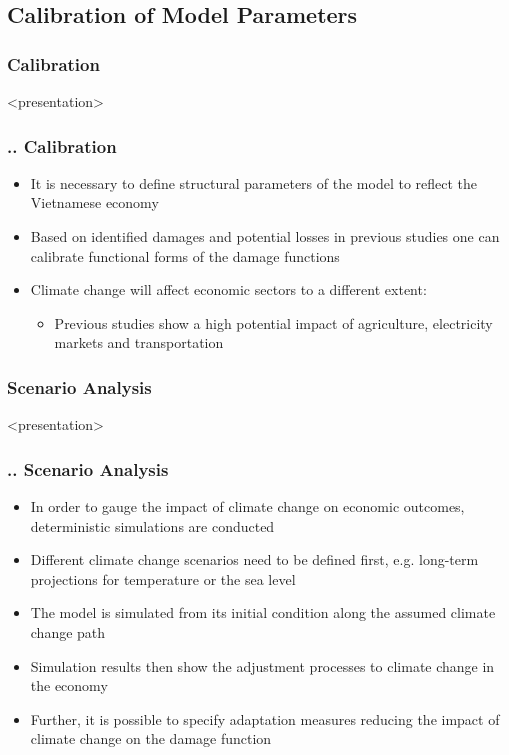\documentclass[11pt,aspectratio=169]{beamer}
\begin{document}
\subsection{Calibration of Model Parameters}
\subsubsection{Calibration}
\begin{frame}<presentation>
	\frametitle{{\thesection.\thesubsection.\thesubsubsection} Calibration}
	\begin{itemize}
		\item	It is necessary to define structural parameters of the model to reflect the Vietnamese economy
		\item Based on identified damages and potential losses in previous studies one can calibrate functional forms of the damage functions
		\item Climate change will affect economic sectors to a different extent:
		\begin{itemize} 
			\item Previous studies show a high potential impact of agriculture, electricity markets and transportation
		\end{itemize}
	\end{itemize}
\end{frame}


\subsubsection{Scenario Analysis}
\begin{frame}<presentation>
	\frametitle{{\thesection.\thesubsection.\thesubsubsection} Scenario Analysis}
\begin{itemize}
	\item In order to gauge the impact of climate change on economic outcomes, deterministic simulations are conducted
	\item Different climate change scenarios need to be defined first, e.g. long-term projections for temperature or the sea level
	\item The model is simulated from its initial condition along the assumed climate change path
	\item Simulation results then show the adjustment processes to climate change in the economy
	\item Further, it is possible to specify adaptation measures reducing the impact of climate change on the damage function %
	\end{itemize}
\end{frame}
\end{document}
